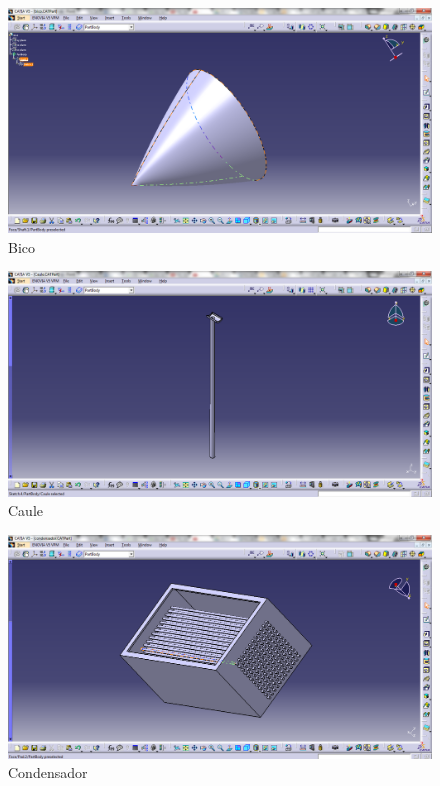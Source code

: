 \begin{figure}[!htbp]
	  \centering
	  \includegraphics[scale=0.45]{editaveis/figuras/C_Bico}
	  \caption[Bico]{Bico}
	  \label{Bico}
	\end{figure}
	\FloatBarrier
	
\begin{figure}[!htbp]
	  \centering
	  \includegraphics[scale=0.45]{editaveis/figuras/C_Caule_1}
	  \caption[Caule]{Caule}
	  \label{Caule1}
	\end{figure}
	\FloatBarrier
	
\begin{figure}[!htbp]
	  \centering
	  \includegraphics[scale=0.45]{editaveis/figuras/C_condensador}
	  \caption[Condensador]{Condensador}
	  \label{Condensador}
	\end{figure}
	\FloatBarrier
	
